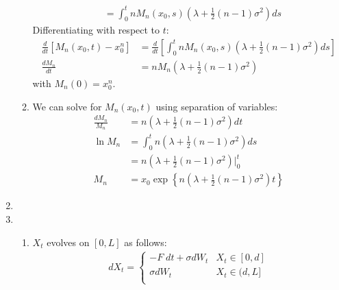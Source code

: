 \documentclass[12pt]{article}
\theoremstyle{plain}
\theoremstyle{definition}
\theoremstyle{remark}
\begin{document}
\begin{enumerate}
\begin{enumerate}
\begin{align*}
          &= \int^t_0 n
            M_n(x_0,s)
            \left(
            \lambda + \frac{1}{2}(n-1) \sigma^2
            \right) ds
        \end{align*}
        Differentiating with respect to $t$:
        \begin{align*}
          \frac{d}{dt}\left[
          M_n(x_0,t) - x_0^n
          \right]
          &=
          \frac{d}{dt}\left[
          \int^t_0 n
            M_n(x_0,s)
            \left(
            \lambda + \frac{1}{2}(n-1) \sigma^2
            \right) ds
          \right]\\
          \frac{dM_n}{dt}
          &=
            nM_n
            \left( \lambda + \frac{1}{2}(n-1) \sigma^2 \right)
        \end{align*}
        with $M_n(0) = x_0^n$.

      \item %
        We can solve for $M_n(x_0,t)$ using separation of variables:
        \begin{align*}
          \frac{dM_n}{M_n}
          &= n \left( \lambda + \frac{1}{2}(n-1) \sigma^2 \right) dt\\
          \ln M_n
          &=
          \int_0^t
          n \left( \lambda + \frac{1}{2}(n-1) \sigma^2 \right) ds\\
          &=
          n \left( \lambda + \frac{1}{2}(n-1) \sigma^2 \right) |_0^t\\
          M_n
          &=
          x_0\exp\left\{
            n \left( \lambda + \frac{1}{2}(n-1) \sigma^2 \right)t
          \right\}
        \end{align*}
    \end{enumerate}

  \item %

  \item %
    \begin{enumerate}
      \item %
        $X_t$ evolves on $[0,L]$ as follows:
        \begin{align*}
          dX_t =
          \begin{cases}
            -F \; dt + \sigma dW_t & X_t \in [0,d]\\
            \sigma dW_t & X_t \in (d,L]\\
          \end{cases}
        \end{align*}
    \end{enumerate}


\end{enumerate}
\end{document}
